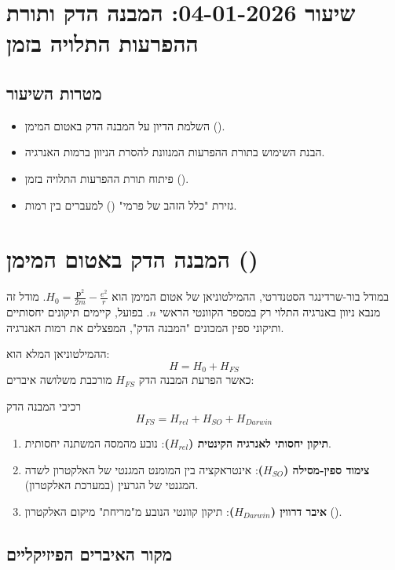 
 \section{שיעור 04-01-2026: המבנה הדק ותורת ההפרעות התלויה בזמן}

\subsection*{מטרות השיעור}
\begin{itemize}
    \item השלמת הדיון על המבנה הדק באטום המימן ().
    \item הבנת השימוש בתורת ההפרעות המנוונת להסרת הניוון ברמות האנרגיה.
    \item פיתוח תורת ההפרעות התלויה בזמן ().
    \item גזירת "כלל הזהב של פרמי" () למעברים בין רמות.
\end{itemize}

\section{\texorpdfstring{המבנה הדק באטום המימן ()}{המבנה הדק באטום המימן (Fine Structure)}}

במודל בור-שרדינגר הסטנדרטי, ההמילטוניאן של אטום המימן הוא $H_0 = \frac{\mathbf{p}^2}{2m} - \frac{e^2}{r}$. מודל זה מנבא ניוון באנרגיה התלוי רק במספר הקוונטי הראשי $n$.
בפועל, קיימים תיקונים יחסותיים ותיקוני ספין המכונים "המבנה הדק", המפצלים את רמות האנרגיה.

ההמילטוניאן המלא הוא:
\[ H = H_0 + H_{FS} \]
כאשר הפרעת המבנה הדק $H_{FS}$ מורכבת משלושה איברים:
\begin{definitionbox}{רכיבי המבנה הדק}
\[ H_{FS} = H_{rel} + H_{SO} + H_{Darwin} \]
\begin{enumerate}
    \item \textbf{תיקון יחסותי לאנרגיה הקינטית ($H_{rel}$)}: נובע מהמסה המשתנה יחסותית.
    \item \textbf{צימוד ספין-מסילה ($H_{SO}$)}: אינטראקציה בין המומנט המגנטי של האלקטרון לשדה המגנטי של הגרעין (במערכת האלקטרון).
    \item \textbf{איבר דרווין ($H_{Darwin}$)}: תיקון קוונטי הנובע מ"מריחת" מיקום האלקטרון ().
\end{enumerate}
\end{definitionbox}

\subsection{מקור האיברים הפיזיקליים}


